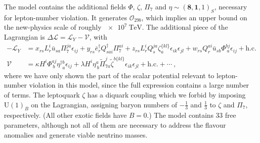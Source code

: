 The model contains the additional fields $\Phi$, $\zeta$, $\Pi_{7}$ and
$\eta \sim (\mathbf{8}, \mathbf{1}, 1)_{S}$, necessary for lepton-number
violation. It generates $\mathcal{O}_{29b}$, which implies an upper bound on the
new-physics scale of roughly $\SI{e7}{\TeV}$. The additional piece of the
Lagrangian is $\Delta \mathscr{L} = \mathscr{L}_{Y} - \mathcal{V}$, with
\begin{align}
  -\mathscr{L}_{Y} &= x_{rs} L^{i}_{r}\bar{u}_{sa} \Pi^{ja}_{7} \epsilon_{ij} +  y_{rs} \bar{e}^{\dagger}_{r} Q_{sai}^{\dagger} \Pi^{ai}_{7} + z_{rs}L^{i}_{r} Q^{ja}_{s} \zeta_{a}^{\{kl\}} \epsilon_{ik} \epsilon_{jl} + w_{rs} Q^{ai}_{r} \bar{u}_{sb} \Phi^{bj}_{\ a} \epsilon_{ij}  + \text{h.c.} \label{eq:ch2-flav-anom-yuks} \\
  \mathcal{V} &= \kappa H^{i} \Phi^{a j}_{\ b} \eta^{\dagger b}_{\ \ a} \epsilon_{ij} + \lambda H^{i} \eta^{a}_{\ b} \tilde{\Pi}^{j}_{7a} \tilde{\zeta}^{b \{kl\}} \epsilon_{ik}\epsilon_{jl} + \text{h.c.} + \cdots \ ,
\end{align}
where we have only shown the part of the scalar potential relevant to
lepton-number violation in this model, since the full expression contains a
large number of terms. The leptoquark $\zeta$ has a diquark coupling which we
forbid by imposing $\mathrm{U}(1)_{B}$ on the Lagrangian, assigning baryon
numbers of $-\tfrac{1}{3}$ and $\tfrac{1}{3}$ to $\zeta$ and $\Pi_{7}$,
respectively. (All other exotic fields have $B = 0$.) The model contains 33 free
parameters, although not all of them are necessary to address the flavour
anomalies and generate viable neutrino masses.

